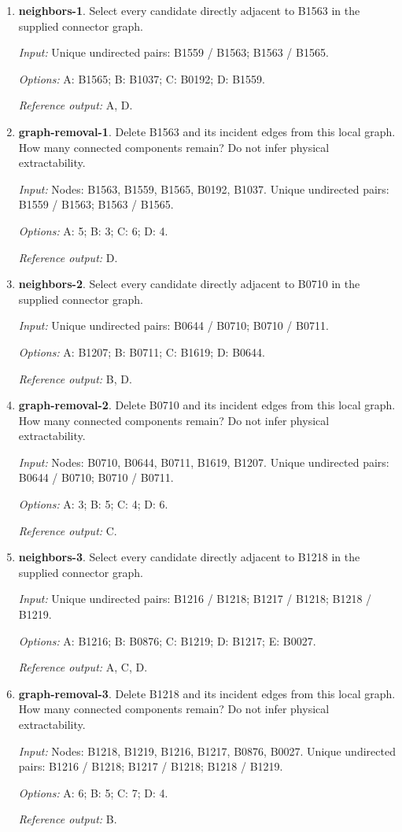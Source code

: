 \begin{enumerate}
\item \textbf{neighbors-1}. Select every candidate directly adjacent to B1563 in the supplied connector graph.\par {\small \textit{Input:} Unique undirected pairs: B1559 / B1563; B1563 / B1565. \par\textit{Options:} A: B1565; B: B1037; C: B0192; D: B1559. \par\textit{Reference output:} A, D.}
\item \textbf{graph-removal-1}. Delete B1563 and its incident edges from this local graph. How many connected components remain? Do not infer physical extractability.\par {\small \textit{Input:} Nodes: B1563, B1559, B1565, B0192, B1037. Unique undirected pairs: B1559 / B1563; B1563 / B1565. \par\textit{Options:} A: 5; B: 3; C: 6; D: 4. \par\textit{Reference output:} D.}
\item \textbf{neighbors-2}. Select every candidate directly adjacent to B0710 in the supplied connector graph.\par {\small \textit{Input:} Unique undirected pairs: B0644 / B0710; B0710 / B0711. \par\textit{Options:} A: B1207; B: B0711; C: B1619; D: B0644. \par\textit{Reference output:} B, D.}
\item \textbf{graph-removal-2}. Delete B0710 and its incident edges from this local graph. How many connected components remain? Do not infer physical extractability.\par {\small \textit{Input:} Nodes: B0710, B0644, B0711, B1619, B1207. Unique undirected pairs: B0644 / B0710; B0710 / B0711. \par\textit{Options:} A: 3; B: 5; C: 4; D: 6. \par\textit{Reference output:} C.}
\item \textbf{neighbors-3}. Select every candidate directly adjacent to B1218 in the supplied connector graph.\par {\small \textit{Input:} Unique undirected pairs: B1216 / B1218; B1217 / B1218; B1218 / B1219. \par\textit{Options:} A: B1216; B: B0876; C: B1219; D: B1217; E: B0027. \par\textit{Reference output:} A, C, D.}
\item \textbf{graph-removal-3}. Delete B1218 and its incident edges from this local graph. How many connected components remain? Do not infer physical extractability.\par {\small \textit{Input:} Nodes: B1218, B1219, B1216, B1217, B0876, B0027. Unique undirected pairs: B1216 / B1218; B1217 / B1218; B1218 / B1219. \par\textit{Options:} A: 6; B: 5; C: 7; D: 4. \par\textit{Reference output:} B.}

\end{enumerate}
